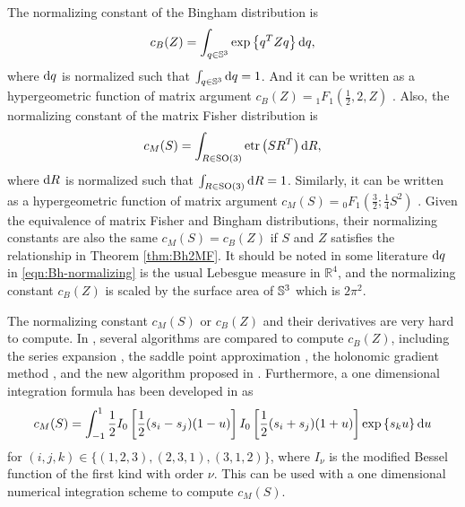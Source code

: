 The normalizing constant of the Bingham distribution is
\begin{align} \label{eqn:Bh-normalizing}
	c_B(Z) = \int_{q\in\mathbb{S}^3} \exp\left\{ q^TZq \right\} \mathrm{d} q,
\end{align}
where $\mathrm{d} q$ is normalized such that $\int_{q\in\mathbb{S}^3} \mathrm{d} q = 1$.
And it can be written as a hypergeometric function of
matrix argument $c_B(Z) = {}_1F_1(\frac{1}{2},2,Z)$ \cite{bingham1974antipodally}.
Also, the normalizing constant of the matrix Fisher distribution is
\begin{align} \label{eqn:MF-normalizing}
	c_M(S) = \int_{R\in\mathrm{SO}(3)} \mathrm{etr}\left( SR^T \right) \mathrm{d} R,
\end{align}
where $\mathrm{d} R$ is normalized such that $\int_{R\in\mathrm{SO}(3)}\mathrm{d} R = 1$.
Similarly, it can be written as a hypergeometric function of
matrix argument $c_M(S) = {}_0F_1(\tfrac{3}{2};\tfrac{1}{4}S^2)$ \cite{khatri1977mises}.
Given the equivalence of matrix Fisher and Bingham distributions, their normalizing constants are also the same $c_M(S) = c_B(Z)$ \cite{lee2018bayesian} if $S$ and $Z$ satisfies the relationship in Theorem \ref{thm:Bh2MF}.
It should be noted in some literature $\mathrm{d} q$ in \eqref{eqn:Bh-normalizing} is the usual Lebesgue measure in $\mathbb{R}^4$, and the normalizing constant $c_B(Z)$ is scaled by the surface area of $\mathbb{S}^3$ which is $2\pi^2$.

The normalizing constant $c_M(S)$ or $c_B(Z)$ and their derivatives are very hard to compute.
In \cite{gilitschenski2014efficient}, several algorithms are compared to compute $c_B(Z)$, including the series expansion \cite{koev2006efficient}, the saddle point approximation \cite{kume2005saddlepoint}, the holonomic gradient method \cite{sei2015calculating}, and the new algorithm proposed in \cite{koev2006efficient}.
Furthermore, a one dimensional integration formula has been developed in \cite{lee2018bayesian,wood1993estimation} as
\begin{align} \label{eqn:MF-normalizing-1dInt}
	c_M(S) = \int_{-1}^1 \frac{1}{2} I_0\left[ \frac{1}{2}(s_i-s_j)(1-u) \right] I_0\left[ \frac{1}{2}(s_i+s_j)(1+u) \right] \exp\left\{ s_ku \right\} \mathrm{d} u
\end{align}
for $(i,j,k) \in \{(1,2,3),(2,3,1),(3,1,2)\}$, where $I_\nu$ is the modified Bessel function of the first kind with order $\nu$.
This can be used with a one dimensional numerical integration scheme to compute $c_M(S)$.

